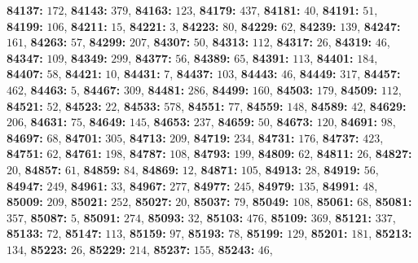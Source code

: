 \textsf{\bfseries 84137:} $172$, \textsf{\bfseries 84143:} $379$, \textsf{\bfseries 84163:} $123$, \textsf{\bfseries 84179:} $437$, \textsf{\bfseries 84181:} $40$, \textsf{\bfseries 84191:} $51$, \textsf{\bfseries 84199:} $106$, \textsf{\bfseries 84211:} $15$, \textsf{\bfseries 84221:} $3$, \textsf{\bfseries 84223:} $80$, \textsf{\bfseries 84229:} $62$, \textsf{\bfseries 84239:} $139$, \textsf{\bfseries 84247:} $161$, \textsf{\bfseries 84263:} $57$, \textsf{\bfseries 84299:} $207$, \textsf{\bfseries 84307:} $50$, \textsf{\bfseries 84313:} $112$, \textsf{\bfseries 84317:} $26$, \textsf{\bfseries 84319:} $46$, \textsf{\bfseries 84347:} $109$, \textsf{\bfseries 84349:} $299$, \textsf{\bfseries 84377:} $56$, \textsf{\bfseries 84389:} $65$, \textsf{\bfseries 84391:} $113$, \textsf{\bfseries 84401:} $184$, \textsf{\bfseries 84407:} $58$, \textsf{\bfseries 84421:} $10$, \textsf{\bfseries 84431:} $7$, \textsf{\bfseries 84437:} $103$, \textsf{\bfseries 84443:} $46$, \textsf{\bfseries 84449:} $317$, \textsf{\bfseries 84457:} $462$, \textsf{\bfseries 84463:} $5$, \textsf{\bfseries 84467:} $309$, \textsf{\bfseries 84481:} $286$, \textsf{\bfseries 84499:} $160$, \textsf{\bfseries 84503:} $179$, \textsf{\bfseries 84509:} $112$, \textsf{\bfseries 84521:} $52$, \textsf{\bfseries 84523:} $22$, \textsf{\bfseries 84533:} $578$, \textsf{\bfseries 84551:} $77$, \textsf{\bfseries 84559:} $148$, \textsf{\bfseries 84589:} $42$, \textsf{\bfseries 84629:} $206$, \textsf{\bfseries 84631:} $75$, \textsf{\bfseries 84649:} $145$, \textsf{\bfseries 84653:} $237$, \textsf{\bfseries 84659:} $50$, \textsf{\bfseries 84673:} $120$, \textsf{\bfseries 84691:} $98$, \textsf{\bfseries 84697:} $68$, \textsf{\bfseries 84701:} $305$, \textsf{\bfseries 84713:} $209$, \textsf{\bfseries 84719:} $234$, \textsf{\bfseries 84731:} $176$, \textsf{\bfseries 84737:} $423$, \textsf{\bfseries 84751:} $62$, \textsf{\bfseries 84761:} $198$, \textsf{\bfseries 84787:} $108$, \textsf{\bfseries 84793:} $199$, \textsf{\bfseries 84809:} $62$, \textsf{\bfseries 84811:} $26$, \textsf{\bfseries 84827:} $20$, \textsf{\bfseries 84857:} $61$, \textsf{\bfseries 84859:} $84$, \textsf{\bfseries 84869:} $12$, \textsf{\bfseries 84871:} $105$, \textsf{\bfseries 84913:} $28$, \textsf{\bfseries 84919:} $56$, \textsf{\bfseries 84947:} $249$, \textsf{\bfseries 84961:} $33$, \textsf{\bfseries 84967:} $277$, \textsf{\bfseries 84977:} $245$, \textsf{\bfseries 84979:} $135$, \textsf{\bfseries 84991:} $48$, \textsf{\bfseries 85009:} $209$, \textsf{\bfseries 85021:} $252$, \textsf{\bfseries 85027:} $20$, \textsf{\bfseries 85037:} $79$, \textsf{\bfseries 85049:} $108$, \textsf{\bfseries 85061:} $68$, \textsf{\bfseries 85081:} $357$, \textsf{\bfseries 85087:} $5$, \textsf{\bfseries 85091:} $274$, \textsf{\bfseries 85093:} $32$, \textsf{\bfseries 85103:} $476$, \textsf{\bfseries 85109:} $369$, \textsf{\bfseries 85121:} $337$, \textsf{\bfseries 85133:} $72$, \textsf{\bfseries 85147:} $113$, \textsf{\bfseries 85159:} $97$, \textsf{\bfseries 85193:} $78$, \textsf{\bfseries 85199:} $129$, \textsf{\bfseries 85201:} $181$, \textsf{\bfseries 85213:} $134$, \textsf{\bfseries 85223:} $26$, \textsf{\bfseries 85229:} $214$, \textsf{\bfseries 85237:} $155$, \textsf{\bfseries 85243:} $46$, 
